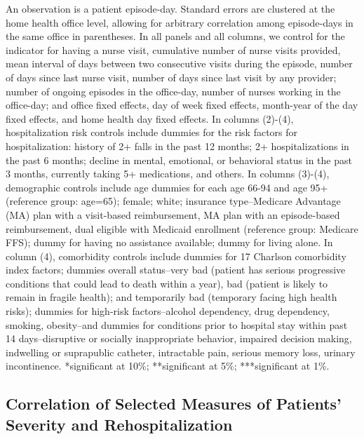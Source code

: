 \documentclass[final,12pt, notitlepage]{article}
\begin{document}
\begin{singlespace}
\begin{table}[H]
\begin{threeparttable}
\begin{tablenotes}
	An observation is a patient episode-day. Standard errors are clustered at the home health office level, allowing for arbitrary correlation among episode-days in the same office in parentheses.
	In all panels and all columns, we control for the indicator for having a nurse visit, cumulative number of nurse visits provided, mean interval of days between two consecutive visits during the episode, number of days since last nurse visit, number of days since last visit by any provider; number of ongoing episodes in the office-day, number of nurses working in the office-day; and office fixed effects, day of week fixed effects, month-year of the day fixed effects, and home health day fixed effects.
	In columns (2)-(4), hospitalization risk controls include dummies for the risk factors for hospitalization: history of 2+ falls in the past 12 months; 2+ hospitalizations in the past 6 months; decline in mental, emotional, or behavioral status in the past 3 months, currently taking 5+ medications, and others.
	In columns (3)-(4), demographic controls include age dummies for each age 66-94 and age 95+ (reference group: age=65); female; white; insurance type--Medicare Advantage (MA) plan with a visit-based reimbursement, MA plan with an episode-based reimbursement, dual eligible with Medicaid enrollment (reference group: Medicare FFS); dummy for having no assistance available; dummy for living alone.
	In column (4), comorbidity controls include dummies for 17 Charlson comorbidity index factors; dummies overall status--very bad (patient has serious progressive conditions that could lead to death within a year), bad (patient is likely to remain in fragile health); and temporarily bad (temporary facing high health risks); dummies for high-risk factors--alcohol dependency, drug dependency, smoking, obesity--and dummies for conditions prior to hospital stay within past 14 days--disruptive or socially inappropriate behavior, impaired decision making, indwelling or suprapublic catheter, intractable pain, serious memory loss, urinary incontinence.
	 *significant at 10\%; **significant at 5\%; ***significant at 1\%.
	\end{tablenotes}
\end{threeparttable}
\end{table}



\clearpage
\subsection{Correlation of Selected Measures of Patients' Severity and Rehospitalization}
\label{appendix:corr_severity}


\end{singlespace}
\end{document}
